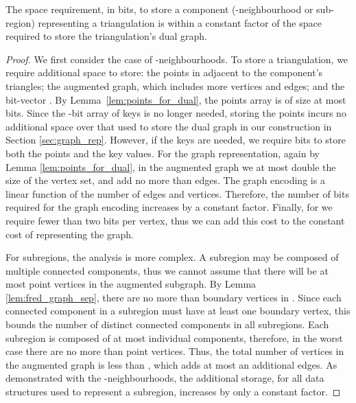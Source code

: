 \begin{lemma}\label{lem:terrain_components}
The space requirement, in bits, to store a component (-neighbourhood
 or sub-region) representing a triangulation is within a constant factor of the 
space required to store the triangulation's dual graph. 
\end{lemma}

\begin{proof}
We first consider the case of -neighbourhoods. 
To store a triangulation, we require additional space to store: the points in  
adjacent to the component's triangles; the augmented 
graph, which includes more vertices and edges; and the bit-vector . 
By Lemma~\ref{lem:points_for_dual}, the points array is of size at most 
 bits. 
Since the -bit array of keys is no longer needed, storing the 
points incurs no additional space over that used to store the dual graph 
in our construction in Section \ref{sec:graph_rep}. 
However, if the keys are needed, we require 
 bits to 
store both the points and the key values.  
For the graph representation, again by Lemma \ref{lem:points_for_dual}, in 
the augmented graph we at most double the size of the vertex set, and add 
no more than  edges. 
The graph encoding is a linear function of the number of edges and 
vertices. 
Therefore, the number of bits required for the graph encoding 
increases by a constant factor. 
Finally, for  we require fewer than two bits per vertex, thus we can add 
this cost to the constant cost of representing the graph.

For subregions, the analysis is more complex. 
A subregion may be composed of multiple connected components, thus we cannot 
assume that there will be at most  point vertices in the 
augmented subgraph.  
By Lemma \ref{lem:fred_graph_sep}, there are no more than 
 boundary vertices in . 
Since each connected component in a subregion must have at least one boundary vertex, 
this bounds the number of distinct connected components in all subregions. 
Each subregion is composed of at most  individual 
components, therefore, in the worst case there are no more than 
 point vertices. 
Thus, the total number of vertices in the augmented graph is less than 
, which adds at most an additional  edges. 
As demonstrated with the -neighbourhoods, the additional storage, 
for all data structures used to represent a subregion, 
increases by only a constant factor.
\end{proof}

